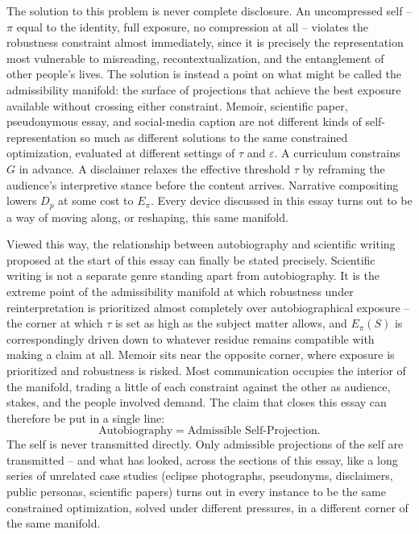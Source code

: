 \documentclass[11pt]{article}
\theoremstyle{plain}
\begin{document}
The solution to this problem is never complete disclosure. An uncompressed self -- $\pi$ equal to the identity, full exposure, no compression at all -- violates the robustness constraint almost immediately, since it is precisely the representation most vulnerable to misreading, recontextualization, and the entanglement of other people's lives. The solution is instead a point on what might be called the admissibility manifold: the surface of projections that achieve the best exposure available without crossing either constraint. Memoir, scientific paper, pseudonymous essay, and social-media caption are not different kinds of self-representation so much as different solutions to the same constrained optimization, evaluated at different settings of $\tau$ and $\varepsilon$. A curriculum constrains $G$ in advance. A disclaimer relaxes the effective threshold $\tau$ by reframing the audience's interpretive stance before the content arrives. Narrative compositing lowers $D_p$ at some cost to $E_\pi$. Every device discussed in this essay turns out to be a way of moving along, or reshaping, this same manifold.

Viewed this way, the relationship between autobiography and scientific writing proposed at the start of this essay can finally be stated precisely. Scientific writing is not a separate genre standing apart from autobiography. It is the extreme point of the admissibility manifold at which robustness under reinterpretation is prioritized almost completely over autobiographical exposure -- the corner at which $\tau$ is set as high as the subject matter allows, and $E_\pi(S)$ is correspondingly driven down to whatever residue remains compatible with making a claim at all. Memoir sits near the opposite corner, where exposure is prioritized and robustness is risked. Most communication occupies the interior of the manifold, trading a little of each constraint against the other as audience, stakes, and the people involved demand. The claim that closes this essay can therefore be put in a single line:
\[
\text{Autobiography} \;=\; \text{Admissible Self-Projection.}
\]
The self is never transmitted directly. Only admissible projections of the self are transmitted -- and what has looked, across the sections of this essay, like a long series of unrelated case studies (eclipse photographs, pseudonyms, disclaimers, public personas, scientific papers) turns out in every instance to be the same constrained optimization, solved under different pressures, in a different corner of the same manifold.
\end{document}
